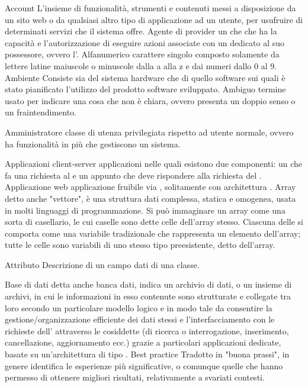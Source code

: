 \Inizio{}
\elemento
{Account} 
{L'insieme di funzionalità, strumenti e contenuti messi a disposizione da un sito web o da qualsiasi altro tipo di applicazione ad un utente, per usufruire di determinati servizi che il sistema offre.}
\elemento
{Agente di provider} 
{un  che che ha la capacità e l'autorizzazione di eseguire azioni associate con un  dedicato al suo possessore, ovvero l'.}
\elemento
{Alfanumerico}
{carattere singolo composto solamente da lettere latine maiuscole o minuscole dalla a alla z e dai numeri dallo 0 al 9.}
\elemento
{Ambiente}
{Consiste sia del sistema hardware che di quello software sui quali è stato pianificato l'utilizzo del prodotto software sviluppato.}
\elemento
{Ambiguo}
{termine usato per indicare una cosa che non è chiara, ovvero presenta un doppio senso o un fraintendimento.}

\elemento
{Amministratore} 
{classe di utenza privilegiata rispetto ad utente normale, ovvero ha funzionalità in più che gestiscono un sistema.}

\elemento
{Applicazioni client-server}
{applicazioni nelle quali esistono due componenti: un  che fa una richiesta al  e un  appunto che deve rispondere alla richiesta del .}
\elemento
{Applicazione web} 
{applicazione fruibile via , solitamente con architettura .}
\elemento
{Array} 
{detto anche "vettore", è una struttura dati complessa, statica e omogenea, usata in molti linguaggi di programmazione. Si può immaginare un array come una sorta di casellario, le cui caselle sono dette celle dell'array stesso. Ciascuna delle  si comporta come una variabile tradizionale che rappresenta un elemento dell'array; tutte le celle sono variabili di uno stesso tipo preesistente, detto  dell'array.}

\elemento
{Attributo}
{Descrizione di un campo dati di una classe.}

\elemento
{Base di dati} 
{detta anche banca dati, indica un archivio di dati, o un insieme di archivi, in cui le informazioni in esso contenute sono strutturate e collegate tra loro secondo un particolare modello logico e in modo tale da consentire la gestione/organizzazione efficiente dei dati stessi e l'interfacciamento con le richieste dell' attraverso le cosiddette  (di ricerca o interrogazione, inserimento, cancellazione, aggiornamento ecc.) grazie a particolari applicazioni  dedicate, basate su un'architettura di tipo .}
\elemento
{Best practice} 
{Tradotto in "buona prassi", in genere identifica le esperienze più significative, o comunque quelle che hanno permesso di ottenere migliori risultati, relativamente a svariati contesti.}

